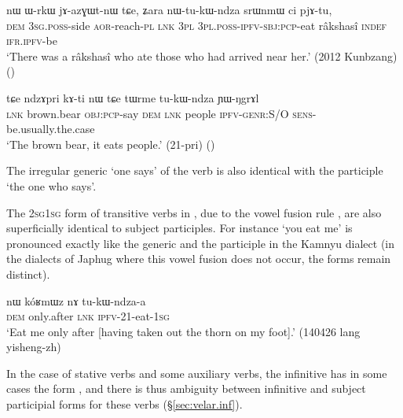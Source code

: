 \begin{exe}
\ex \label{ex:tukWndza.nmlz}
 \gll nɯ ɯ-rkɯ jɤ-azɣɯt-nɯ tɕe, ʑara nɯ-tu-kɯ-ndza srɯnmɯ ci pjɤ-tu, \\
 \textsc{dem} \textsc{3sg}.\textsc{poss}-side \textsc{aor}-reach-\textsc{pl} \textsc{lnk} \textsc{3pl} \textsc{3pl}.\textsc{poss}-\textsc{ipfv}-\textsc{sbj}:\textsc{pcp}-eat râkshasî \textsc{indef} \textsc{ifr}.\textsc{ipfv}-be \\
\glt `There was a râkshasî who ate those who had arrived near her.' (2012 Kunbzang) ()
\end{exe}

\begin{exe}
\ex \label{ex:tukWndza.genr}
 \gll tɕe ndzɤpri kɤ-ti nɯ tɕe tɯrme tu-kɯ-ndza ɲɯ-ŋgrɤl  \\
 \textsc{lnk} brown.bear \textsc{obj}:\textsc{pcp}-say \textsc{dem} \textsc{lnk} people \textsc{ipfv}-\textsc{genr}:S/O \textsc{sens}-be.usually.the.case \\
\glt `The brown bear, it eats people.' (21-pri)
()
\end{exe}
 
The irregular generic  `one says' of the verb  is also identical with the participle `the one who says'.

The \textsc{2sg}\fl{}\textsc{1sg} form of transitive verbs in , due to the vowel fusion rule  \fl{} , are also superficially identical to subject participles. For instance  `you eat me' is pronounced  exactly like the generic and the participle  in the Kamnyu dialect (in the dialects of Japhug where this vowel fusion does not occur, the forms remain distinct).

\begin{exe}
\ex \label{ex:tukWndzaa}
 \gll nɯ kóʁmɯz nɤ tu-kɯ-ndza-a \\
 \textsc{dem} only.after \textsc{lnk} \textsc{ipfv}-2\fl{}1-eat-\textsc{1sg} \\
 \glt `Eat me only after [having taken out the thorn on my foot].' (140426 lang yisheng-zh)
\end{exe} 

In the case of stative verbs and some auxiliary verbs, the infinitive has in some cases the form , and there is thus ambiguity between infinitive and subject participial forms for these verbs (§\ref{sec:velar.inf}).

